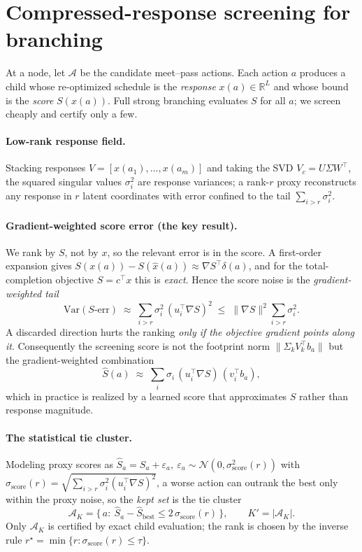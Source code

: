 \documentclass[11pt]{article}
\begin{document}
\section{Compressed-response screening for branching}\label{sec:screen}
At a node, let $\mathcal{A}$ be the candidate meet--pass actions. Each action $a$ produces a
child whose re-optimized schedule is the \emph{response} $x(a)\in\mathbb{R}^L$ and whose bound
is the \emph{score} $S(x(a))$. Full strong branching evaluates $S$ for all $a$; we screen
cheaply and certify only a few.

\paragraph{Low-rank response field.} Stacking responses $V=[x(a_1),\dots,x(a_m)]$ and taking
the SVD $V_c=U\Sigma W^\top$, the squared singular values $\sigma_i^2$ are response variances;
a rank-$r$ proxy reconstructs any response in $r$ latent coordinates with error confined to
the tail $\sum_{i>r}\sigma_i^2$.

\paragraph{Gradient-weighted score error (the key result).} We rank by $S$, not by $x$, so the
relevant error is in the score. A first-order expansion gives
$S(x(a))-S(\hat x(a))\approx \nabla S^\top \delta(a)$, and for the total-completion objective
$S=c^\top x$ this is \emph{exact}. Hence the score noise is the \emph{gradient-weighted tail}
\begin{equation}
\mathrm{Var}\!\left(S\text{-err}\right)\;\approx\;\sum_{i>r}\sigma_i^2\,(u_i^\top\nabla S)^2
\;\le\; \|\nabla S\|^2\sum_{i>r}\sigma_i^2 .
\label{eq:gw}
\end{equation}
A discarded direction hurts the ranking \emph{only if the objective gradient points along it}.
Consequently the screening score is not the footprint norm $\|\Sigma_k V_k^\top b_a\|$ but the
gradient-weighted combination
\begin{equation}
\hat S(a)\;\approx\;\sum_i \sigma_i\,(u_i^\top \nabla S)\,(v_i^\top b_a),
\label{eq:score}
\end{equation}
which in practice is realized by a learned score that approximates $S$ rather than response
magnitude.

\paragraph{The statistical tie cluster.} Modeling proxy scores as
$\hat S_a=S_a+\varepsilon_a,\ \varepsilon_a\sim\mathcal N(0,\sigma_{\text{score}}^2(r))$ with
$\sigma_{\text{score}}(r)=\sqrt{\sum_{i>r}\sigma_i^2(u_i^\top\nabla S)^2}$, a worse action can
outrank the best only within the proxy noise, so the \emph{kept set} is the tie cluster
\begin{equation}
\mathcal A_K=\{\,a:\ \hat S_a-\hat S_{\text{best}}\le 2\,\sigma_{\text{score}}(r)\,\},\qquad K'=|\mathcal A_K|.
\end{equation}
Only $\mathcal A_K$ is certified by exact child evaluation; the rank is chosen by the inverse
rule $r^\star=\min\{r:\sigma_{\text{score}}(r)\le\tau\}$.
\end{document}
